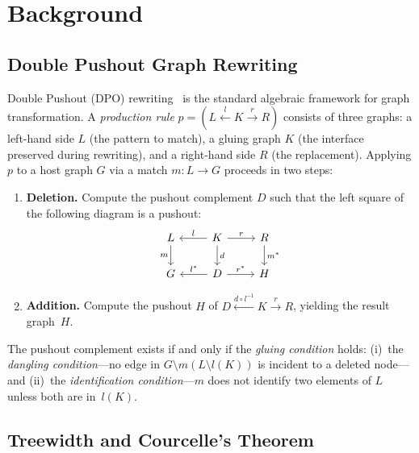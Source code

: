 \documentclass[11pt,a4paper]{article}
\theoremstyle{definition}
\theoremstyle{remark}
\begin{document}
\section{Background}
\label{sec:background}

\subsection{Double Pushout Graph Rewriting}
\label{sec:bg-dpo}

Double Pushout (DPO) rewriting~\cite{ehrig2006} is the standard
algebraic framework for graph transformation. A \emph{production rule}
$p = (L \xleftarrow{l} K \xrightarrow{r} R)$ consists of three
graphs: a left-hand side $L$ (the pattern to match), a gluing graph
$K$ (the interface preserved during rewriting), and a right-hand
side $R$ (the replacement). Applying $p$ to a host graph $G$ via a
match $m : L \to G$ proceeds in two steps:

\begin{enumerate}
\item \textbf{Deletion.} Compute the pushout complement $D$ such that
  the left square of the following diagram is a pushout:
  \[
  \begin{tikzcd}
    L \arrow[d, "m"'] & K \arrow[l, "l"'] \arrow[r, "r"]
      \arrow[d, "d"] & R \arrow[d, "m^*"] \\
    G & D \arrow[l, "l^*"'] \arrow[r, "r^*"] & H
  \end{tikzcd}
  \]

\item \textbf{Addition.} Compute the pushout $H$ of
  $D \xleftarrow{d \circ l^{-1}} K \xrightarrow{r} R$, yielding the
  result graph~$H$.
\end{enumerate}

The pushout complement exists if and only if the \emph{gluing
condition} holds: (i)~the \emph{dangling condition}---no edge in
$G \setminus m(L \setminus l(K))$ is incident to a deleted
node---and (ii)~the \emph{identification condition}---$m$ does not
identify two elements of $L$ unless both are in~$l(K)$.

\subsection{Treewidth and Courcelle's Theorem}
\label{sec:bg-treewidth}
\end{document}
